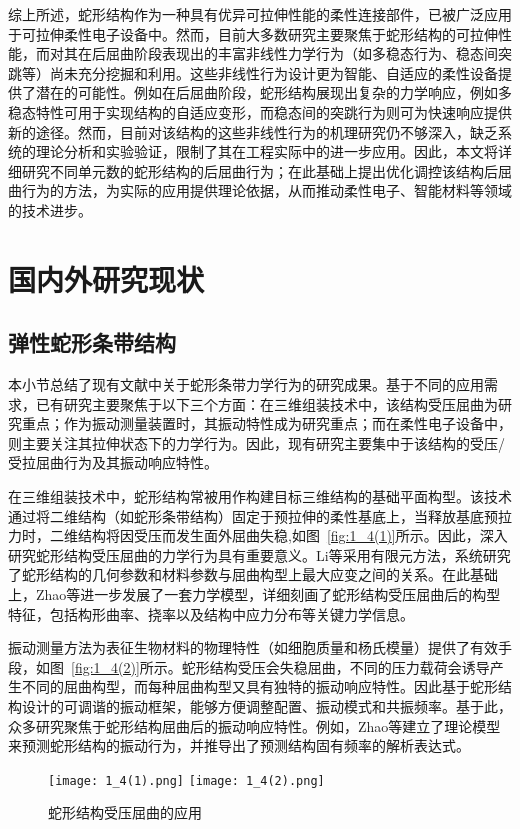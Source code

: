 综上所述，蛇形结构作为一种具有优异可拉伸性能的柔性连接部件，已被广泛应用于可拉伸柔性电子设备中。然而，目前大多数研究主要聚焦于蛇形结构的可拉伸性能，而对其在后屈曲阶段表现出的丰富非线性力学行为（如多稳态行为、稳态间突跳等）尚未充分挖掘和利用。这些非线性行为设计更为智能、自适应的柔性设备提供了潜在的可能性。例如在后屈曲阶段，蛇形结构展现出复杂的力学响应，例如多稳态特性可用于实现结构的自适应变形，而稳态间的突跳行为则可为快速响应提供新的途径。然而，目前对该结构的这些非线性行为的机理研究仍不够深入，缺乏系统的理论分析和实验验证，限制了其在工程实际中的进一步应用。因此，本文将详细研究不同单元数的蛇形结构的后屈曲行为；在此基础上提出优化调控该结构后屈曲行为的方法，为实际的应用提供理论依据，从而推动柔性电子、智能材料等领域的技术进步。


\section{国内外研究现状}
\subsection{弹性蛇形条带结构}
本小节总结了现有文献中关于蛇形条带力学行为的研究成果。基于不同的应用需求，已有研究主要聚焦于以下三个方面：在三维组装技术\cite{cheng2023programming}中，该结构受压屈曲为研究重点；作为振动测量装置时，其振动特性成为研究重点；而在柔性电子设备中，则主要关注其拉伸状态下的力学行为。因此，现有研究主要集中于该结构的受压/受拉屈曲行为及其振动响应特性。

在三维组装技术中\cite{cheng2023programming}，蛇形结构常被用作构建目标三维结构的基础平面构型。该技术通过将二维结构（如蛇形条带结构）固定于预拉伸的柔性基底上，当释放基底预拉力时，二维结构将因受压而发生面外屈曲失稳,如图~\ref{fig:1_4(1)}所示。因此，深入研究蛇形结构受压屈曲的力学行为具有重要意义。Li等\cite{li2019mechanics}采用有限元方法，系统研究了蛇形结构的几何参数和材料参数与屈曲构型上最大应变之间的关系。在此基础上，Zhao等\cite{zhao2021torsional}进一步发展了一套力学模型，详细刻画了蛇形结构受压屈曲后的构型特征，包括构形曲率、挠率以及结构中应力分布等关键力学信息。

振动测量方法为表征生物材料的物理特性（如细胞质量和杨氏模量）提供了有效手段，如图~\ref{fig:1_4(2)}所示。蛇形结构受压会失稳屈曲，不同的压力载荷会诱导产生不同的屈曲构型，而每种屈曲构型又具有独特的振动响应特性。因此基于蛇形结构设计的可调谐的振动框架\cite{zhao2021theoretical}，能够方便调整配置、振动模式和共振频率。基于此，众多研究聚焦于蛇形结构屈曲后的振动响应特性。例如，Zhao等\cite{zhao2023theoretical}建立了理论模型来预测蛇形结构的振动行为，并推导出了预测结构固有频率的解析表达式。
\begin{figure}
	\centering
	{\texttt{[image: 1\_4(1).png]}}
	{\texttt{[image: 1\_4(2).png]}}
	\caption{蛇形结构受压屈曲的应用}
	\label{fig:1_4v}
\end{figure}

